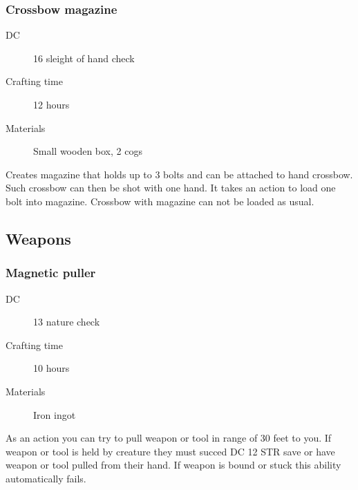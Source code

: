\subsubsection{Crossbow magazine}

\begin{description}
\item [DC] 16 sleight of hand check
\item [Crafting time] 12 hours
\item [Materials] Small wooden box, 2 cogs
\end{description}

Creates magazine that holds up to 3 bolts and can be attached to hand crossbow. Such crossbow can then be shot with one hand. It takes an action to load one bolt into magazine. Crossbow with magazine can not be loaded as usual.

\subsection{Weapons}

\subsubsection{Magnetic puller}

\begin{description}
\item [DC] 13 nature check
\item [Crafting time] 10 hours
\item [Materials] Iron ingot
\end{description}

As an action you can try to pull weapon or tool in range of 30 feet to you. If weapon or tool is held by creature they must succed DC 12 STR save or have weapon or tool pulled from their hand. If weapon is bound or stuck this ability automatically fails.